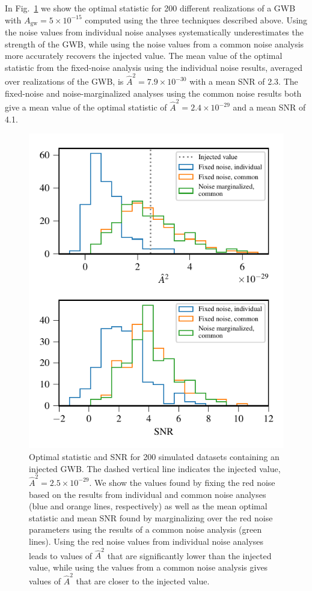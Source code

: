 \documentclass[twocolumn,aps,prd,superscriptaddress]{revtex4-1}
\newcommand{\Agw}{\ensuremath{A_\mathrm{gw}}}
\begin{document}
In Fig.~\ref{fig:os_datasetstats} we show the optimal statistic 
for 200 different realizations of a GWB with $\Agw = 5\times10^{-15}$ 
computed using the three techniques described above. 
Using the noise values from individual noise analyses 
systematically underestimates the strength of the GWB, 
while using the noise values from a common noise analysis more accurately recovers the injected value. 
The mean value of the optimal statistic from the fixed-noise analysis using the individual noise results, 
averaged over realizations of the GWB, is $\hat{A}^2 = 7.9 \times10^{-30}$ with a mean SNR of 2.3. 
The fixed-noise and noise-marginalized analyses using the common noise results both give 
a mean value of the optimal statistic of $\hat{A}^2 = 2.4\times10^{-29}$ and a mean SNR of 4.1.
\begin{figure}[t]
	\includegraphics[width=0.95\columnwidth]{plots/optstat_A5e-15.pdf}
	\caption{Optimal statistic and SNR for 200 simulated datasets 
			containing an injected GWB. 
			The dashed vertical line indicates the injected value, $\hat{A}^2 = 2.5 \times 10^{-29}$. 
			We show the values found by fixing the red noise 
			based on the results from individual and common noise analyses 
			(blue and orange lines, respectively) 
			as well as the mean optimal statistic and mean SNR found by marginalizing over 
			the red noise parameters using the results of a common noise analysis (green lines). 
			Using the red noise values from individual noise analyses leads to values of $\hat{A}^2$ 
			that are significantly lower than the injected value, 
			while using the values from a common noise analysis gives values of $\hat{A}^2$ 
			that are closer to the injected value.}
	\label{fig:os_datasetstats}
\end{figure}
\end{document}
